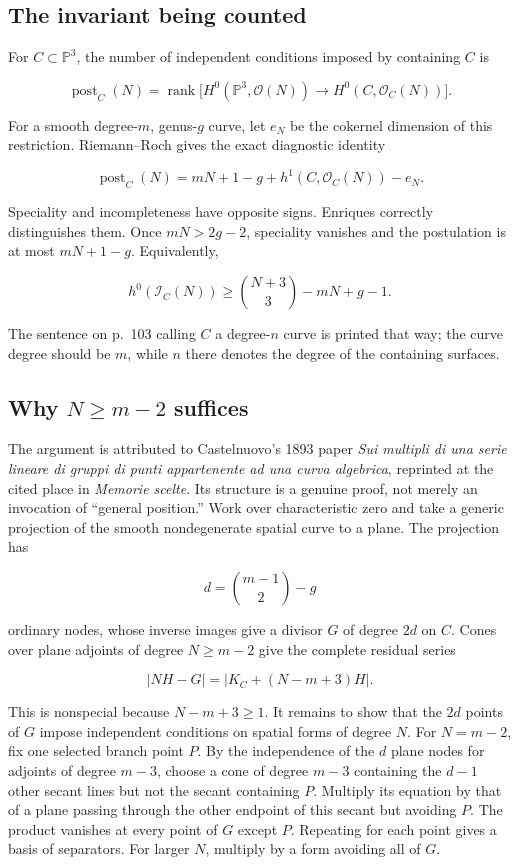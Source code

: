 \subsection{The invariant being counted}

For \(C\subset\mathbb P^3\), the number of independent conditions imposed by containing \(C\) is

\[
 \operatorname{post}_C(N)
 =\operatorname{rank}\bigl[H^0(\mathbb P^3,\mathcal O(N))
 \longrightarrow H^0(C,\mathcal O_C(N))\bigr].
\]

For a smooth degree-\(m\), genus-\(g\) curve, let \(e_N\) be the cokernel dimension of this restriction. Riemann--Roch gives the exact diagnostic identity

\[
 \operatorname{post}_C(N)=mN+1-g+h^1(C,\mathcal O_C(N))-e_N.
\]

Speciality and incompleteness have opposite signs. Enriques correctly distinguishes them. Once \(mN>2g-2\), speciality vanishes and the postulation is at most \(mN+1-g\). Equivalently,

\[
 h^0(\mathcal I_C(N))\geq\binom{N+3}{3}-mN+g-1.
\]

The sentence on p.~103 calling \(C\) a degree-\(n\) curve is printed that way; the curve degree should be \(m\), while \(n\) there denotes the degree of the containing surfaces.

\subsection{\texorpdfstring{Why \(N\geq m-2\) suffices}{Why N\textbackslash geq m-2 suffices}}

The argument is attributed to Castelnuovo's 1893 paper \emph{Sui multipli di una serie lineare di gruppi di punti appartenente ad una curva algebrica}, reprinted at the cited place in \emph{Memorie scelte}. Its structure is a genuine proof, not merely an invocation of ``general position.'' Work over characteristic zero and take a generic projection of the smooth nondegenerate spatial curve to a plane. The projection has

\[
 d=\binom{m-1}{2}-g
\]

ordinary nodes, whose inverse images give a divisor \(G\) of degree \(2d\) on \(C\). Cones over plane adjoints of degree \(N\geq m-2\) give the complete residual series

\[
 |NH-G|=|K_C+(N-m+3)H|.
\]

This is nonspecial because \(N-m+3\geq1\). It remains to show that the \(2d\) points of \(G\) impose independent conditions on spatial forms of degree \(N\). For \(N=m-2\), fix one selected branch point \(P\). By the independence of the \(d\) plane nodes for adjoints of degree \(m-3\), choose a cone of degree \(m-3\) containing the \(d-1\) other secant lines but not the secant containing \(P\). Multiply its equation by that of a plane passing through the other endpoint of this secant but avoiding \(P\). The product vanishes at every point of \(G\) except \(P\). Repeating for each point gives a basis of separators. For larger \(N\), multiply by a form avoiding all of \(G\).

